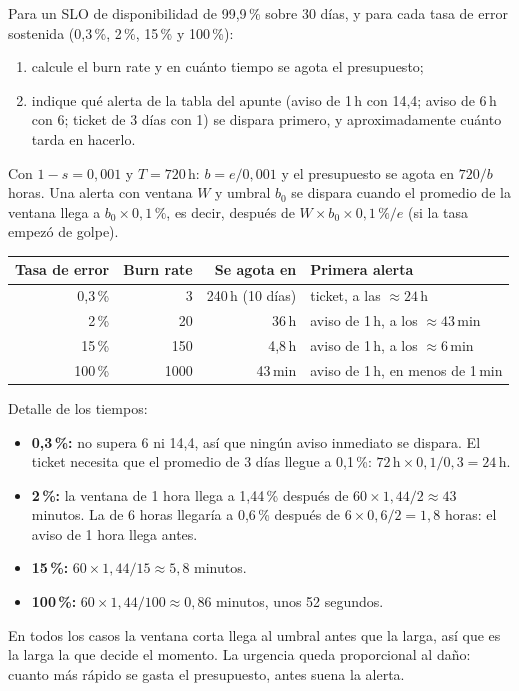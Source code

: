 \documentclass[variant=guia,cover=institutional,mode=screen]{ua-engineering-v6-article}
\begin{document}
\begin{uaexercise}
Para un SLO de disponibilidad de 99,9\,\% sobre 30 días, y para cada tasa de error sostenida (0,3\,\%, 2\,\%, 15\,\% y 100\,\%):
\begin{enumerate}
\item calcule el burn rate y en cuánto tiempo se agota el presupuesto;
\item indique qué alerta de la tabla del apunte (aviso de 1\,h con 14,4; aviso de 6\,h con 6; ticket de 3 días con 1) se dispara primero, y aproximadamente cuánto tarda en hacerlo.
\end{enumerate}
\end{uaexercise}
\begin{uaanswer}
Con $1 - s = 0{,}001$ y $T = 720$\,h: $b = e / 0{,}001$ y el presupuesto se agota en $720 / b$ horas. Una alerta con ventana $W$ y umbral $b_0$ se dispara cuando el promedio de la ventana llega a $b_0 \times 0{,}1\,\%$, es decir, después de $W \times b_0 \times 0{,}1\,\% / e$ (si la tasa empezó de golpe).

\begin{center}
\small
\begin{tabular}{rrrl}
\toprule
\textbf{Tasa de error} & \textbf{Burn rate} & \textbf{Se agota en} & \textbf{Primera alerta} \\
\midrule
0,3\,\% & 3 & 240\,h (10 días) & ticket, a las $\approx 24$\,h \\
2\,\% & 20 & 36\,h & aviso de 1\,h, a los $\approx 43$\,min \\
15\,\% & 150 & 4,8\,h & aviso de 1\,h, a los $\approx 6$\,min \\
100\,\% & 1000 & 43\,min & aviso de 1\,h, en menos de 1\,min \\
\bottomrule
\end{tabular}
\end{center}

Detalle de los tiempos:
\begin{itemize}
\item \textbf{0,3\,\%:} no supera 6 ni 14,4, así que ningún aviso inmediato se dispara. El ticket necesita que el promedio de 3 días llegue a 0,1\,\%: $72\,\text{h} \times 0{,}1 / 0{,}3 = 24$\,h.
\item \textbf{2\,\%:} la ventana de 1 hora llega a 1,44\,\% después de $60 \times 1{,}44 / 2 \approx 43$ minutos. La de 6 horas llegaría a 0,6\,\% después de $6 \times 0{,}6 / 2 = 1{,}8$ horas: el aviso de 1 hora llega antes.
\item \textbf{15\,\%:} $60 \times 1{,}44 / 15 \approx 5{,}8$ minutos.
\item \textbf{100\,\%:} $60 \times 1{,}44 / 100 \approx 0{,}86$ minutos, unos 52 segundos.
\end{itemize}
En todos los casos la ventana corta llega al umbral antes que la larga, así que es la larga la que decide el momento. La urgencia queda proporcional al daño: cuanto más rápido se gasta el presupuesto, antes suena la alerta.
\end{uaanswer}
\end{document}
